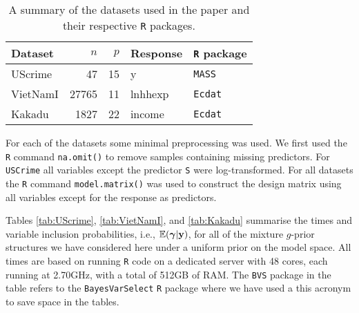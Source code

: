 \begin{table}[h]
	\begin{center}
		\begin{tabular}{l|r|r|l|l}
			Dataset	& $n$ & $p$ & Response & {\tt R} package \\ 
			\hline 
			UScrime 	& 47 & 15 & y & {\tt MASS} \\  
			VietNamI	& 27765 & 11 & lnhhexp & {\tt Ecdat}  \\ 
			Kakadu	& 1827 & 22 & income & {\tt Ecdat}   \\  
		\end{tabular} 
	\end{center}
	\caption{A summary of the datasets used in the paper and their respective {\tt R} packages.}
	\label{tab:g_prior_datasets}
\end{table}

For each of the datasets some minimal preprocessing was used.
We first used the {\tt R} command {\tt na.omit()} to remove samples containing missing predictors. 
For {\tt USCrime} all variables except the predictor {\tt S} were log-transformed. For all datasets
the {\tt R} command {\tt model.matrix()} was used to construct the design matrix using all 
variables except for the response as predictors.

Tables \ref{tab:UScrime}, \ref{tab:VietNamI}, and \ref{tab:Kakadu} summarise the times and variable 
inclusion probabilities, i.e., ${\mathbb E}({\boldsymbol \gamma}|{\bf y})$, for all of the mixture $g$-prior structures we have considered here under a uniform prior
on the model space.  
All times are based on running {\tt R} code on a dedicated server with 48 cores,
each running at 2.70GHz, with a total of 512GB of RAM.
The {\tt BVS} package in the table refers to the {\tt BayesVarSelect} {\tt R} package where we have used a this acronym to save space in the tables. 




